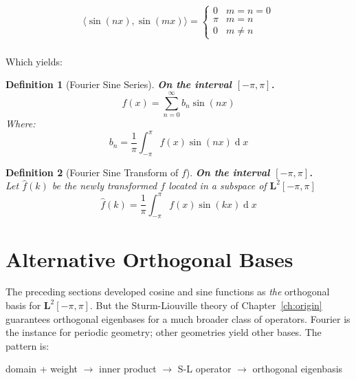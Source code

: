 \documentclass[12pt,a4paper]{report}
\DeclareMathOperator{\deriv}{d}
\theoremstyle{thms}
\theoremstyle{defns}
\newtheorem{definition}{Definition}[section]
\begin{document}
\begin{align}
    \langle \sin(nx), \sin(mx) \rangle = \begin{cases}
        0   & m = n = 0 \\
        \pi & m = n     \\
        0   & m \neq n
    \end{cases} \\
\end{align}

Which yields:

\begin{definition}[Fourier Sine Series]
    \textbf{On the interval $[-\pi, \pi]$.}\\
    \begin{equation}
        f(x) = \sum_{n=0}^{\infty}b_n\sin(nx)
    \end{equation}
    Where:
    \begin{equation}
        b_n = \dfrac{1}{\pi}\int_{-\pi}^{\pi} f(x)\sin(nx)\deriv{x}
    \end{equation}
\end{definition}

\begin{definition}[Fourier Sine Transform of $f$]
    \textbf{On the interval $[-\pi, \pi]$.}\\
    Let $\hat{f}(k)$ be the newly transformed $f$ located in a subspace of $\mathbf{L}^2[-\pi, \pi]$
    \begin{equation}
        \hat{f}(k) = \dfrac{1}{\pi}\int_{-\pi}^{\pi} f(x)\sin(kx)\deriv{x}
    \end{equation}
\end{definition}


\section{Alternative Orthogonal Bases}
\label{sec:orthogonal_polynomials}

The preceding sections developed cosine and sine functions as \textit{the} orthogonal basis for $\mathbf{L}^2[-\pi, \pi]$. But the Sturm-Liouville theory of Chapter~\ref{ch:origin} guarantees orthogonal eigenbases for a much broader class of operators. Fourier is the instance for periodic geometry; other geometries yield other bases. The pattern is:

\begin{center}
    domain + weight $\to$ inner product $\to$ S-L operator $\to$ orthogonal eigenbasis
\end{center}
\end{document}
